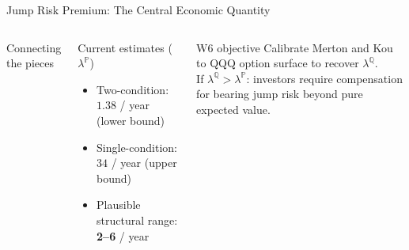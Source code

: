 \documentclass[aspectratio=169,10pt]{beamer}
\begin{document}
\begin{frame}{Jump Risk Premium: The Central Economic Quantity}
\begin{columns}[T]
\begin{block}{Connecting the pieces}
\end{block}

\begin{block}{Current estimates ($\lambda^{\mathbb{P}}$)}
\footnotesize
\begin{itemize}\itemsep2pt
  \item Two-condition: $1.38$ / year (lower bound)
  \item Single-condition: $34$ / year (upper bound)
  \item Plausible structural range: \textbf{2--6} / year
\end{itemize}
\end{block}

\begin{alertblock}{W6 objective}
\footnotesize Calibrate Merton and Kou to QQQ option surface to recover $\lambda^{\mathbb{Q}}$.\\[2pt]
If $\lambda^{\mathbb{Q}} > \lambda^{\mathbb{P}}$: investors require compensation for bearing jump risk beyond pure expected value.
\end{alertblock}
\end{columns}
\end{frame}
\end{document}
